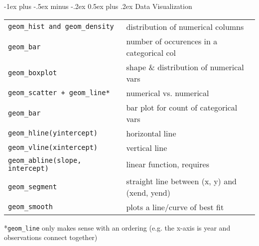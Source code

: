 \documentclass[10pt,landscape]{article}
\makeatletter
\renewcommand{\section}{\@startsection{section}{1}{0mm}%
                                {-1ex plus -.5ex minus -.2ex}%
                                {0.5ex plus .2ex}%
                                {\normalfont\large\bfseries}}
\makeatother
\begin{document}
\raggedright
\footnotesize
\begin{multicols}{3}


\setlength{\premulticols}{1pt}
\setlength{\postmulticols}{1pt}
\setlength{\multicolsep}{1pt}
\setlength{\columnsep}{2pt}

\section{Data Visualization}
\begin{tabular}{@{}ll@{}}
\verb!geom_hist and geom_density!    & distribution of numerical columns \\
\verb!geom_bar!  & number of occurences in a categorical col \\
\verb!geom_boxplot! & shape \& distribution of numerical vars \\
\verb!geom_scatter + geom_line*!  & numerical vs. numerical \\
\verb!geom_bar!  & bar plot for count of categorical vars \\
\verb!geom_hline(yintercept)!  & horizontal line\\
\verb!geom_vline(xintercept)!  & vertical line\\
\verb!geom_abline(slope, intercept)!  & linear function, requires  \\
\verb!geom_segment!  & straight line between (x, y) and (xend, yend) \\
\verb!geom_smooth!  & plots a line/curve of best fit \\
\end{tabular}

*\verb!geom_line! only makes sense with an ordering (e.g. the x-axis is year and observations connect together)


\end{multicols}
\end{document}
